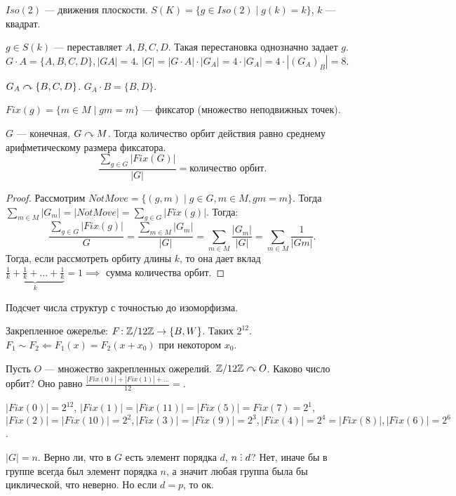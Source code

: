 \begin{example}
    $Iso(2)$ --- движения плоскости.  $S(K) = \{g \in Iso(2) \mid g(k) = k\}$,  $k$ --- квадрат.

    $g \in S(k)$ --- переставляет  $A, B, C, D$. Такая перестановка однозначно задает  $g$.
    $G \cdot A = \{A, B, C, D\}, |GA| = 4$.  $|G| = |G \cdot A| \cdot |G_A| = 4 \cdot |G_A| = 4 \cdot |(G_A)_B| = 8$.

     $G_A \curvearrowright \{B,C,D\}$.  $G_A \cdot B = \{B, D\}$.
\end{example}
\begin{definition}
    $Fix(g) = \{m \in M \mid gm = m\}$ --- фиксатор (множество неподвижных точек).
\end{definition}
\begin{theorem}
    $G$ --- конечная,  $G \curvearrowright M$. Тогда количество орбит действия равно среднему арифметическому размера фиксатора.
     \[
    \frac{\sum_{g \in G} |Fix(G)|}{|G|} = \text{количество орбит}
    .\]
\end{theorem}
\begin{proof}
    Рассмотрим $NotMove = \{(g, m) \mid g \in G, m \in M, gm = m\}$. Тогда  $\sum\limits_{m \in M}|G_m| = |NotMove| = \sum_{g \in G}|Fix(g)|$. Тогда: \[
    \frac{\sum_{g \in G}|Fix(g)|}{G} = \frac{\sum_{m \in M}|G_m|}{|G|} = \sum_{m \in M} \frac{|G_m|}{|G|} = \sum_{m \in M} \frac{1}{|Gm|}
    .\]
    Тогда, если рассмотреть орбиту длины $k$, то она дает вклад  $\underbrace{\frac{1}{k} + \frac{1}{k} + \ldots + \frac{1}{k}}_{k} = 1 \implies$ сумма количества орбит.
\end{proof}
\begin{example}
    Подсчет числа структур с точностью до изоморфизма.

    Закрепленное ожерелье: $F\!: \mathbb{Z} / 12\mathbb{Z} \to \{B, W\}$. Таких  $2^{12}$.
     $F_1 \sim F_2 \Leftarrow F_1(x) = F_2(x + x_0)$ при некотором $x_0$.

     Пусть  $O$ --- множество закрепленных ожерелий.  $\mathbb{Z} / 12\mathbb{Z} \curvearrowright O$. Каково число орбит?  Оно равно  $\frac{|Fix(0)| + |Fix(1)| + \ldots}{12} = $.

     $|Fix(0)| = 2^{12}$,  $|Fix(1)| = |Fix(11)| = |Fix(5)| = Fix(7) = 2^1$,  $|Fix(2)| = |Fix(10)| = 2^2, |Fix(3)| = |Fix(9)| = 2^3, |Fix(4)| = 2^4 = |Fix(8)|, |Fix(6)| = 2^6$.
\end{example}
$|G| = n$. Верно ли, что в  $G$ есть элемент порядка  $d$, $n \divby d$? Нет, иначе  бы в группе всегда был элемент порядка $n$, а значит любая группа была бы циклической, что неверно. Но если $d = p$, то ок.

